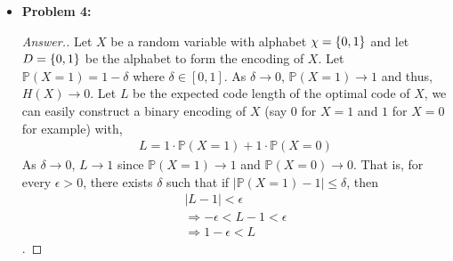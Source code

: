 \documentclass[10pt,twoside]{article}
\newcommand{\Pro}{\ensuremath{\mathbb{P}}}
\begin{document}
\begin{itemize}
    \begin{proof}[Answer to 3]
        Since the entropy of each $X_i$ is max when $H(X_i)=1/2$, we know that
        \begin{gather*}
            H(X_1, \ldots, X_n) =\sum_{i=1}^n H(X_i) \leq n\cdot H(1/2) = n
        \end{gather*}
        Let $L^*$ be the minimum average number of questions required. We know that $L^*$ must satisfy,
        \begin{gather*}
            L^* \leq n
        \end{gather*}
    \end{proof}

\newpage
    
    \item\textbf{Problem 4:} \newline
    \noindent\makebox[\linewidth]{\rule{18cm}{0.4pt}}
    \begin{proof}[Answer.]
     Let $X$ be a random variable with alphabet $\chi = \{0, 1\}$ and let $D= \{0,1\}$ be the alphabet to form the encoding of $X$. Let $\Pro(X = 1) = 1 - \delta$ where $\delta\in [0, 1]$. As $\delta \to 0$, $\Pro(X = 1)\to 1$ and thus, $H(X)\to 0$. Let $L$ be the expected code length of the optimal code of $X$, we can easily construct a binary encoding of $X$ (say $0$ for $X=1$ and $1$ for $X=0$ for example) with,
     \begin{gather*}
         L = 1\cdot \Pro(X = 1) + 1\cdot \Pro(X=0)
     \end{gather*} As $\delta\to 0$, $L\to 1$ since $\Pro(X=1)\to 1$ and $\Pro(X=0)\to 0$. That is, for every $\epsilon > 0$, there exists $\delta$ such that if $|\Pro(X=1) - 1|\leq \delta$, then 
     \begin{gather*}
         |L - 1|< \epsilon \\
         \Rightarrow -\epsilon < L - 1 < \epsilon \\
         \Rightarrow 1 - \epsilon < L
     \end{gather*}.%
     

\end{proof}
\end{itemize}
\end{document}
